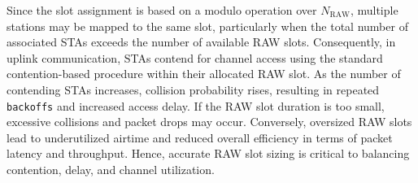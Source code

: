 \documentclass[journal]{IEEEtran}
\newcommand{\rev}[1]{{\color{blue}#1}}
\begin{document}
Since the slot assignment is based on a modulo operation over $N_{\text{RAW}}$, multiple stations may be mapped to the same slot, particularly when the total number of associated STAs exceeds the number of available RAW slots. %
Consequently, in uplink communication, STAs contend for channel access using the standard contention-based procedure within their allocated RAW slot. As the number of contending STAs increases, collision probability rises, resulting in repeated \texttt{backoffs} and increased access delay. If the RAW slot duration is too small, excessive collisions and packet drops may occur. Conversely, oversized RAW slots lead to underutilized airtime and \rev{reduced overall efficiency in terms of packet latency and throughput}. Hence, accurate RAW slot sizing is critical to balancing contention, delay, and channel utilization. %
\end{document}
